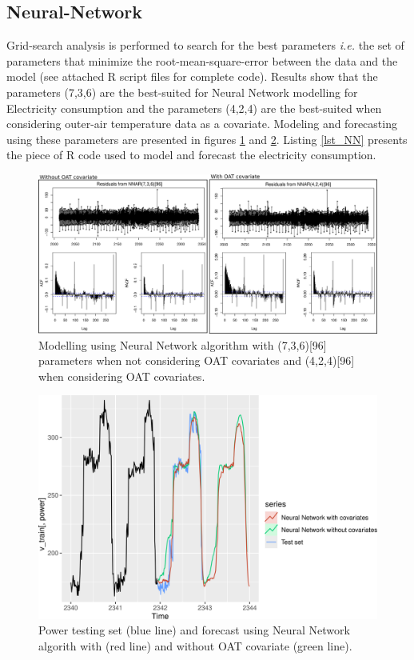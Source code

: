 \subsection{Neural-Network}
Grid-search analysis is performed to search for the best parameters \textit{i.e.} the set of 
parameters that minimize the root-mean-square-error between the data and the model (see attached R 
script files for complete code). Results show that the parameters (7,3,6) are the best-suited for 
Neural Network modelling for Electricity consumption and the parameters (4,2,4) are the best-suited 
when considering outer-air temperature data as a covariate. Modeling and forecasting using these 
parameters are presented in figures \ref{figure_residuals_NN} and \ref{figure_fit_NN}. Listing 
\ref{lst_NN} presents the piece of R code used to model and forecast the electricity consumption. 

\begin{figure}[H]
\centering
 \includegraphics[scale=0.4]{figures/figure_residuals_NN.png}
 \caption{Modelling using Neural Network algorithm with (7,3,6)[96] parameters when not considering OAT covariates and (4,2,4)[96] when considering OAT covariates.}
 \label{figure_residuals_NN}
\end{figure}

\begin{figure}[H]
\centering
 \includegraphics[scale=0.5]{figures/figure_fit_NN.png}
\caption{Power testing set (blue line) and forecast using Neural Network algorith with (red line) and without OAT covariate (green line).}
\label{figure_fit_NN}
\end{figure}

